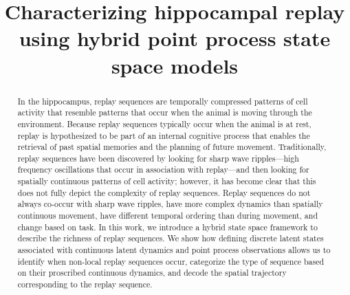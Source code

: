 \documentclass[conference]{IEEEtran}
\begin{document}
\title{Characterizing hippocampal replay using hybrid point process state space models}

\author{
\and
{}
\and
{}

}

\maketitle

\begin{abstract}
In the hippocampus, replay sequences are temporally compressed patterns of cell activity that resemble patterns that occur when the animal is moving through the environment. Because replay sequences typically occur when the animal is at rest, replay is hypothesized to be part of an internal cognitive process that enables the retrieval of past spatial memories and the planning of future movement. Traditionally, replay sequences have been discovered by looking for sharp wave ripples---high frequency oscillations that occur in association with replay---and then looking for spatially continuous patterns of cell activity; however, it has become clear that this does not fully depict the complexity of replay sequences. Replay sequences do not always co-occur with sharp wave ripples, have more complex dynamics than spatially continuous movement, have different temporal ordering than during movement, and change based on task. In this work, we introduce a hybrid state space framework to describe the richness of replay sequences. We show how defining discrete latent states associated with continuous latent dynamics and point process observations allows us to identify when non-local replay sequences occur, categorize the type of sequence based on their proscribed continuous dynamics, and decode the spatial trajectory corresponding to the replay sequence.

\end{abstract}
\end{document}
